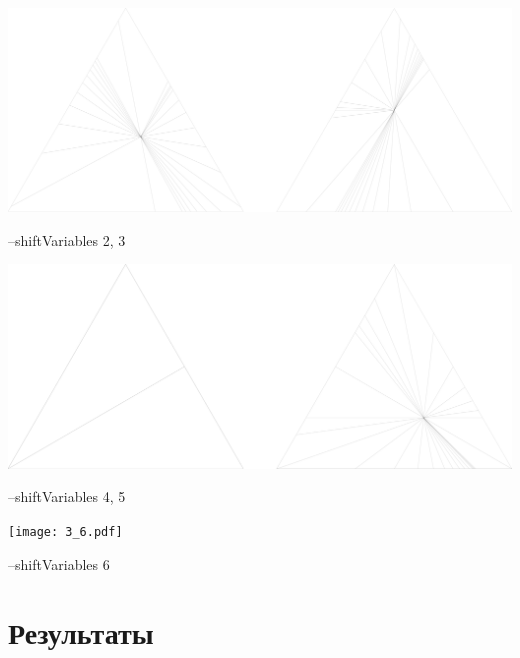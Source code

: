 \begin{enumerate}
\begin{center}
\includegraphics[scale=0.06]{mix2.pdf}
\begin{tt}--shiftVariables 2, 3\end{tt}

\includegraphics[scale=0.06]{mix3.pdf}
\begin{tt}--shiftVariables 4, 5\end{tt}

\texttt{[image: 3\_6.pdf]} \\ 
\begin{tt}--shiftVariables 6\end{tt}

\end{center}


\end{enumerate}

\newpage

\section{Результаты}

